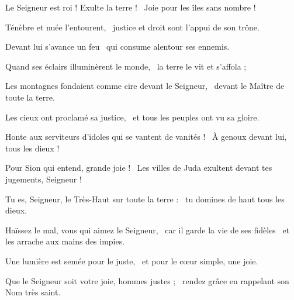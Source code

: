 \item Le Seigneur est roi ! Exulte la terre !~\psstar{} Joie pour les îles sans nombre !
\item Ténèbre et nuée l'entourent,~\psstar{} justice et droit sont l'appui de son trône.
\item Devant lui s'avance un feu~\psstar{} qui consume alentour ses ennemis.
\item Quand ses éclairs illuminèrent le monde,~\psstar{} la terre le vit et s'affola ;
\item Les montagnes fondaient comme cire devant le Seigneur,~\psstar{} devant le Maître de toute la terre.
\item Les cieux ont proclamé sa justice,~\psstar{} et tous les peuples ont vu sa gloire.
\item Honte aux serviteurs d'idoles qui se vantent de vanités !~\psstar{} À genoux devant lui, tous les dieux !
\item Pour Sion qui entend, grande joie !~\psstar{} Les villes de Juda exultent devant tes jugements, Seigneur !
\item Tu es, Seigneur, le Très-Haut sur toute la terre :~\psstar{} tu domines de haut tous les dieux.
\item Haïssez le mal, vous qui aimez le Seigneur,~\pscross{} car il garde la vie de ses fidèles~\psstar{} et les arrache aux mains des impies.
\item Une lumière est semée pour le juste,~\psstar{} et pour le cœur simple, une joie.
\item Que le Seigneur soit votre joie, hommes justes ;~\psstar{} rendez grâce en rappelant son Nom très saint.
